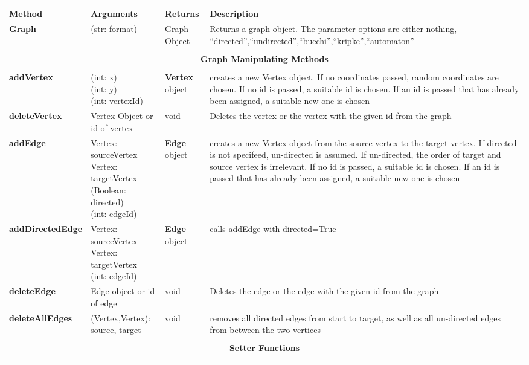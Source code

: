 \documentclass{article}
\newlength\q
\newlength\smallCol
\newlength\argsLen
\begin{document}
\begin{longtable}{m{\smallCol}m{\argsLen}m{\smallCol}m{\q}}
Method & Arguments & Returns & Description \\ \hline
\textbf{Graph}& (str: format) & Graph Object & Returns a graph object. The parameter options are either nothing, ``directed'',``undirected'',``buechi'',``kripke'',``automaton'' \\\hline
\\\multicolumn{4}{c}{\textbf{Graph Manipulating Methods}}\\\\\hline
\textbf{addVertex}  & \makecell{(int: x)\\(int: y)\\(int: vertexId)} & \textbf{Vertex} object & creates a new Vertex object. If no coordinates passed, random coordinates are chosen. If no id is passed, a suitable id is chosen. If an id is passed that has already been assigned, a suitable new one is chosen\\\hline
\textbf{deleteVertex} & Vertex Object or id of vertex & void & Deletes the vertex or the vertex with the given id from the graph\\ \hline
\textbf{addEdge} & \makecell{Vertex: sourceVertex\\Vertex: targetVertex\\(Boolean: directed) \\ (int: edgeId)} & \textbf{Edge} object & creates a new Vertex object from the source vertex to the target vertex. If directed is not specifeed, un-directed is assumed. If un-directed, the order of target and source vertex is irrelevant. If no id is passed, a suitable id is chosen. If an id is passed that has already been assigned, a suitable new one is chosen \\ \hline
\textbf{addDirectedEdge} & \makecell{Vertex: sourceVertex\\Vertex: targetVertex \\ (int: edgeId)} & \textbf{Edge} object & calls addEdge with directed=True \\ \hline
\textbf{deleteEdge} & Edge object or id of edge & void &  Deletes the edge or the edge with the given id from the graph\\ \hline
\textbf{deleteAllEdges} & (Vertex,Vertex): source, target & void & removes all directed edges from start to target, as well as all un-directed edges from between the two vertices \\ \hline
\\\multicolumn{4}{c}{\textbf{Setter Functions}}\\\\\hline

\end{longtable}
\end{document}
